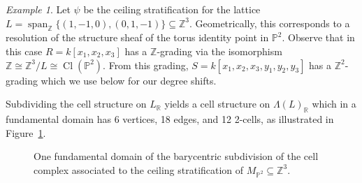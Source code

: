 \documentclass{amsart}
\newcommand{\ZZ}{\mathbb{Z}}
\newcommand{\RR}{\mathbb{R}}
\newcommand{\field}{k}
\DeclareMathOperator{\Cl}{Cl}
\DeclareMathOperator{\mathspan}{span}
\theoremstyle{remark}
\newtheorem{example}[theorem]{Example}
\begin{document}
\begin{example}
  Let $\psi$ be the ceiling stratification for the lattice $L=\mathspan_{\ZZ} \{(1,-1,0),(0,1,-1)\}\subseteq \ZZ^3$. Geometrically, this corresponds to a resolution of the structure sheaf of the torus identity point in $\mathbb{P}^2$. Observe that in this case $R=\field[x_1,x_2,x_3]$ has a $\ZZ$-grading via the isomorphism $\ZZ\cong \ZZ^3/L \cong \Cl(\mathbb{P}^2)$. From this grading, $S=\field[x_1,x_2,x_3,y_1,y_2,y_3]$ has a $\ZZ^2$-grading which we use below for our degree shifts.

  Subdividing the cell structure on $L_{\RR}$ yields a cell structure on $\Lambda(L)_{\RR}$ which in a fundamental domain has 6 vertices, 18 edges, and 12 2-cells, as illustrated in Figure~\ref{fig:bc-p2}.

  \begin{figure}
    \caption{One fundamental domain of the barycentric subdivision of the cell complex associated to the ceiling stratification of $M_{\mathbb{P}^2}\subseteq \ZZ^{3}$.}
    \label{fig:bc-p2}
    

\end{figure}
\end{example}
\end{document}
